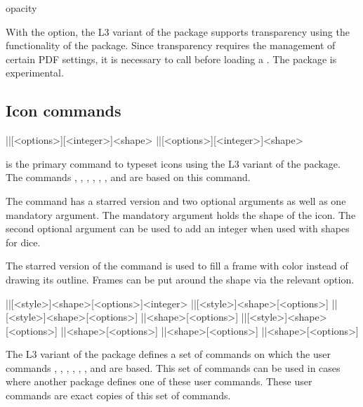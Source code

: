 \documentclass[a4paper]{article}
\begin{document}
\label{macro:opacity}
\begin{macrodef}opacity\end{macrodef}
With the  option, the L3 variant of the package supports transparency using the functionality of the  package. Since transparency requires the management of certain PDF settings, it is necessary to call \macro{\DocumentMetadata{}} before loading a \macro{\documentclass}. The  package is experimental.

\subsection{Icon commands}

\begin{macrodef}
|\RPGIconsUseIcon|[<options>][<integer>]{<shape>}
|\RPGIconsUseIcon*|[<options>][<integer>]{<shape>}
\end{macrodef}
\macro{\RPGIconsUseIcon} is the primary command to typeset icons using the L3 variant of the package. The commands \macro{\die}, \macro{\ability}, \macro{\saving}, \macro{\spell}, \macro{\spellschool}, \macro{\damage}, \macro{\attack} and \macro{\condition} are based on this command. 

The \macro{\RPGIconsUseIcon} command has a starred version and two optional arguments as well as one mandatory argument. The mandatory argument holds the shape of the icon. The second optional argument can be used to add an integer when used with shapes for dice.

The starred version of the command is used to fill a frame with color instead of drawing its outline. Frames can be put around the shape via the relevant  option. 

\begin{macrodef}
|\RPGIconsDie|[<style>]{<shape>}[<options>]{<integer>}
|\RPGIconsAbiliy|[<style>]{<shape>}[<options>]
|\RPGIconsSaving|[<style>]{<shape>}[<options>]
|\RPGIconsSpell|{<shape>}[<options>]
|\RPGIconsSpellschool|[<style>]{<shape>}[<options>]
|\RPGIconsDamage|{<shape>}[<options>]
|\RPGIconsAttack|{<shape>}[<options>]
|\RPGIconsCondition|{<shape>}[<options>]
\end{macrodef}
The L3 variant of the package defines a set of commands on which the user commands \macro{\die}, \macro{\ability}, \macro{\saving}, \macro{\spell}, \macro{\spellschool}, \macro{\damage}, \macro{\attack} and \macro{\condition} are based. This set of commands can be used in cases where another package defines one of these user commands. These user commands are exact copies of this set of commands.
\end{document}
